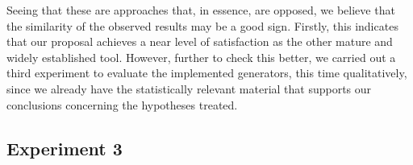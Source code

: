 Seeing that these are approaches that, in essence, are opposed, we believe that the similarity of the observed results may be a good sign.
Firstly, this indicates that our proposal achieves a near level of satisfaction as the other mature and widely established tool.
However, further to check this better, we carried out a third experiment to evaluate the implemented generators, this time qualitatively, since we already have the statistically relevant material that supports our conclusions concerning the hypotheses treated.

\subsection{Experiment 3}
\label{ssec_experiments:Experiment3}

